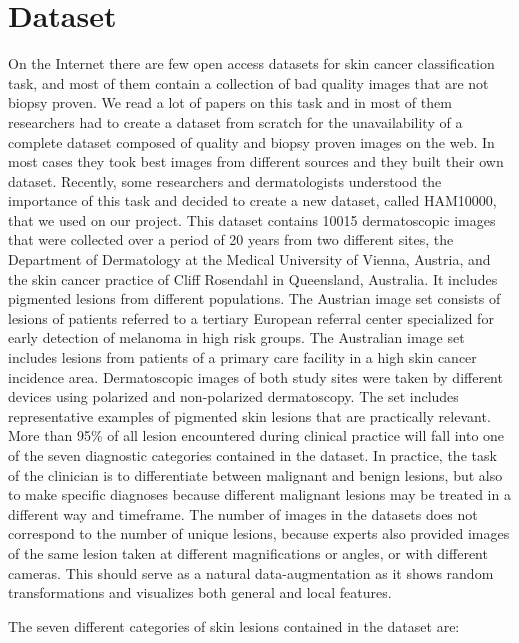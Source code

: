 \section{Dataset} \label{dataset}

	On the Internet there are few open access datasets for skin cancer classification task, and most of them contain a collection of bad quality images that are not biopsy proven. We read a lot of papers on this task and in most of them researchers had to create a dataset from scratch for the unavailability of a complete dataset composed of quality and biopsy proven images on the web. In most cases they took best images from different sources and they built their own dataset. Recently, some researchers and dermatologists understood the importance of this task and decided to create a new dataset, called HAM10000, that we used on our project. 
	This dataset contains 10015 dermatoscopic images that were collected over a period of 20 years from two different sites, the Department of Dermatology at the Medical University of Vienna, Austria, and the skin cancer practice of Cliff Rosendahl in Queensland, Australia. It includes pigmented lesions from different populations. The Austrian image set consists of lesions of patients referred to a tertiary European referral center specialized for early detection of melanoma in high risk groups. The Australian image set includes lesions from patients of a primary care facility in a high skin cancer incidence area. Dermatoscopic images of both study sites were taken by different devices using polarized and non-polarized dermatoscopy. The set includes representative examples of pigmented skin lesions that are practically relevant. More than 95\% of all lesion encountered during clinical practice will fall into one of the seven diagnostic categories contained in the dataset. In practice, the task of the clinician is to differentiate between malignant and benign lesions, but also to make specific diagnoses because different malignant lesions may be treated in a different way and timeframe. The number of images in the datasets does not correspond to the number of unique lesions, because experts also provided images of the same lesion taken at different magnifications or angles, or with different cameras. This should serve as a natural data-augmentation as it shows random transformations and visualizes both general and local features.
	
	\bigskip
	
	The seven different categories of skin lesions contained in the dataset are:
	
